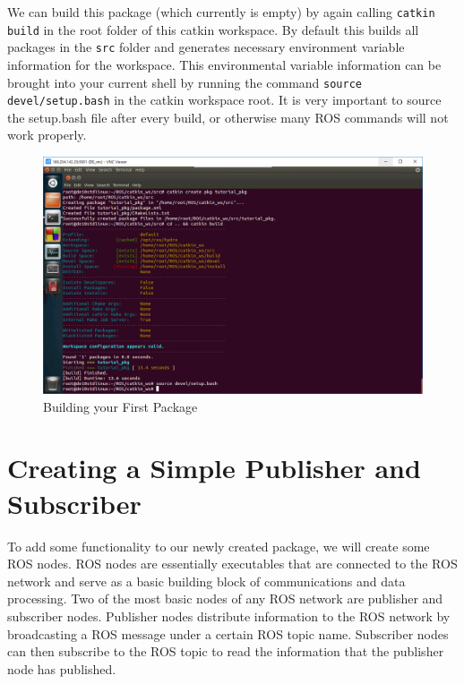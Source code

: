 \documentclass[11pt, twoside, pdftex]{article}
\begin{document}
We can build this package (which currently is empty) by again calling \lstinline|catkin build| in the root folder of this catkin workspace. By default this builds all packages in the \lstinline|src| folder and generates necessary environment variable information for the workspace. This environmental variable information can be brought into your current shell by running the command \lstinline|source devel/setup.bash| in the catkin workspace root. It is very important to source the setup.bash file after every build, or otherwise many ROS commands will not work properly.
\begin{figure}[H]
	\begin{center}
		\includegraphics[scale=0.55]{figures/catkin_build_tutorial_pkg_1.png}
		\caption{Building your First Package}
		\label{fig:catkinbuildtutorialpkg1}
	\end{center}
\end{figure}

\section{Creating a Simple Publisher and Subscriber}
To add some functionality to our newly created package, we will create some ROS nodes. ROS nodes are essentially executables that are connected to the ROS network and serve as a basic building block of communications and data processing. Two of the most basic nodes of any ROS network are publisher and subscriber nodes. Publisher nodes distribute information to the ROS network by broadcasting a ROS message under a certain ROS topic name. Subscriber nodes can then subscribe to the ROS topic to read the information that the publisher node has published.
\end{document}
